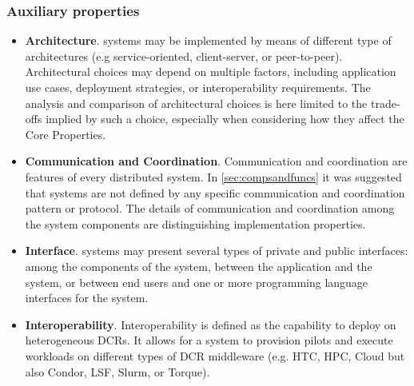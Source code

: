 \documentclass{sig-alternate}
\begin{document}
\subsubsection{Auxiliary properties}
\label{sec:auxprops}

\begin{itemize}

\item \textbf{Architecture}. \pilot systems may be implemented by means of
  different type of architectures (e.g service-oriented, client-server, or
  peer-to-peer). Architectural choices may depend on multiple factors,
  including application use cases, deployment strategies, or interoperability
  requirements.  The analysis and comparison of architectural choices is here
  limited to the trade-offs implied by such a choice, especially when
  considering how they affect the Core Properties.

\item \textbf{Communication and Coordination}. Communication and coordination
  are features of every distributed system. In \ref{sec:compsandfuncs} it was
  suggested that \pilot systems are not defined by any specific communication
  and coordination pattern or protocol. The details of communication and
  coordination among the \pilot system components are distinguishing
  implementation properties.


\item \textbf{Interface}. \pilot systems may present several types of private
  and public interfaces: among the components of the \pilot system, between the
  application and the \pilot system, or between end users and one or more
  programming language interfaces for the \pilot system.

\item \textbf{Interoperability}. Interoperability is defined as the capability
  to deploy \pilots on heterogeneous DCRs. It allows for a \pilot
  system to provision pilots and execute workloads on different types of
  DCR middleware (e.g. HTC, HPC, Cloud but also Condor, LSF, Slurm, or Torque).


\end{itemize}
\end{document}
